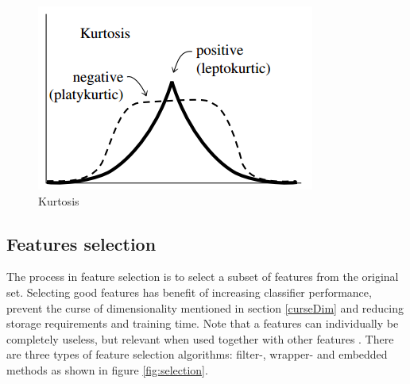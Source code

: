 \documentclass[USenglish]{ifimaster}  %
\begin{document}
	
	\begin{figure}[h]
		\centering
		\includegraphics[scale=0.8]{Figures/Kurtosis}
		\caption{Kurtosis}
		\label{fig:kurtosis}
	\end{figure}
	
	
	
	
\subsection{Features selection}\label{selection}	
The process in feature selection is to select a subset of features from the original set. Selecting good features has benefit of increasing classifier performance, prevent the curse of dimensionality mentioned in section \ref{curseDim} and reducing storage requirements and training time. Note that a features can individually be completely useless, but relevant when used together with other features \cite{Guyon2006}. There are three types of feature selection algorithms: filter-, wrapper- and embedded methods as shown in figure \ref{fig:selection}. 
	
\end{document}
